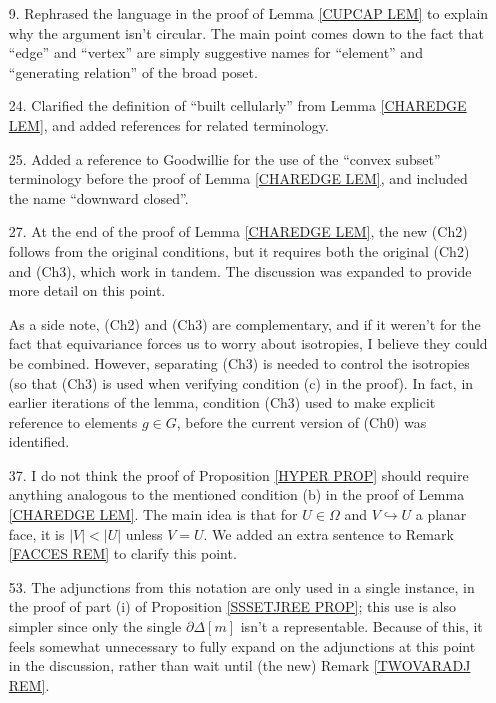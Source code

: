 \documentclass{article}
\begin{document}
\begin{itemize}
\item[9.] Rephrased the language in the proof of Lemma \ref{CUPCAP LEM} to explain why the argument isn't circular. The main point comes down to the fact that ``edge'' and ``vertex'' are simply suggestive names for ``element'' and ``generating relation'' of the broad poset. %
      
\item[24.] Clarified the definition of ``built cellularly'' from Lemma \ref{CHAREDGE LEM}, and added references for related terminology. %


\item[25.] Added a reference to Goodwillie for the use of the ``convex subset'' terminology before the proof of Lemma \ref{CHAREDGE LEM}, and included the name ``downward closed''.

      
\item[27.] At the end of the proof of Lemma \ref{CHAREDGE LEM}, the new (Ch2) follows from the original conditions, but it requires both the original (Ch2) and (Ch3), which work in tandem. The discussion was expanded to provide more detail on this point. %
      
      As a side note, (Ch2) and (Ch3) are complementary, and if it weren't for the fact that equivariance forces us to worry about isotropies, I believe they could be combined. %
      However, separating (Ch3) is needed to control the isotropies (so that (Ch3) is used when verifying condition (c) in the proof). In fact, in earlier iterations of the lemma, condition (Ch3) used to make explicit reference to elements $g \in G$, before the current version of (Ch0) was identified. %
     

\item[37.] I do not think the proof of Proposition \ref{HYPER PROP} should require anything analogous to the mentioned condition (b) in the proof of Lemma \ref{CHAREDGE LEM}.
      The main idea is that for $U \in \Omega$ and $V \hookrightarrow U$ a planar face, it is $|V|<|U|$ unless $V=U$. We added an extra sentence to Remark \ref{FACCES REM} to clarify this point. %
      

\item[53.] The adjunctions from this notation are only used in a single instance, in the proof of part (i) of Proposition \ref{SSSETJREE PROP}; this use is also simpler since only the single $\partial \Delta[m]$ isn't a representable.
      Because of this, it feels somewhat unnecessary to fully expand on the adjunctions at this point in the discussion,
      rather than wait until (the new) Remark \ref{TWOVARADJ REM}. %


\end{itemize}
\end{document}
